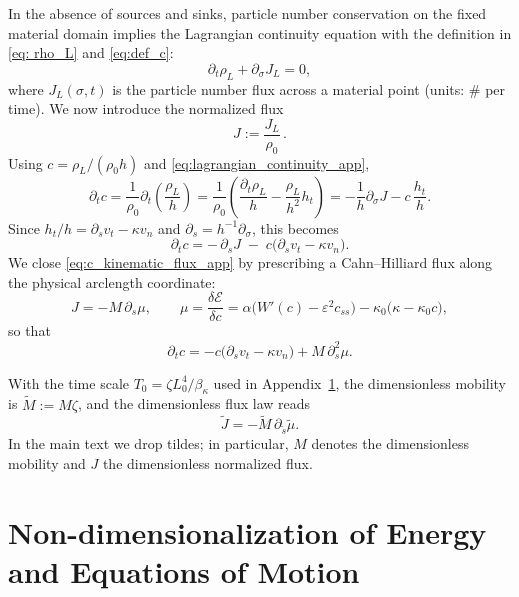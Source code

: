\documentclass[
aip,
jcp,
reprint, 
floatfix
]{revtex4-1}
\begin{document}
In the absence of sources and sinks, particle number conservation on the fixed material domain
implies the Lagrangian continuity equation with the definition in \eqref{eq: rho_L} and \eqref{eq:def_c}:
\begin{equation}
\partial_t \rho_L + \partial_\sigma J_L = 0,
\label{eq:lagrangian_continuity_app}
\end{equation}
where $J_L(\sigma,t)$ is the particle number flux across a material point (units: \# per time).
We now introduce the normalized flux
\begin{equation}
    J:=\frac{J_L}{\rho_0}\,.
\end{equation}
Using $c=\rho_L/(\rho_0 h)$ and \eqref{eq:lagrangian_continuity_app},
\begin{equation}
    \partial_t c=\frac{1}{\rho_0}\partial_t\!\left(\frac{\rho_L}{h}\right)
=\frac{1}{\rho_0}\left(\frac{\partial_t\rho_{L}}{h}-\frac{\rho_L}{h^2}h_t\right)
=-\frac{1}{h}\partial_\sigma J - c\,\frac{h_t}{h}.
\end{equation}
Since $h_t/h=\partial_s v_t-\kappa v_n$ and $\partial_s=h^{-1}\partial_\sigma$, this becomes
\begin{equation}
\partial_t c = -\,\partial_s J \;-\; c\big(\partial_s v_t-\kappa v_n\big).
\label{eq:c_kinematic_flux_app}
\end{equation}
We close \eqref{eq:c_kinematic_flux_app} by prescribing a Cahn--Hilliard flux along the physical
arclength coordinate:
\begin{equation}
J=-M\,\partial_s\mu,
\qquad
\mu=\frac{\delta\mathcal{E}}{\delta c}
=\alpha\big(W'(c)-\varepsilon^2 c_{ss}\big)-\kappa_0\big(\kappa-\kappa_0 c\big),
\label{eq:CH_flux_app}
\end{equation}
so that
\begin{equation}
\partial_t c = -c\big(\partial_s v_t-\kappa v_n\big) + M\,\partial_s^2\mu.
\label{eq:c_evolution_app}
\end{equation}

With the time scale $T_0=\zeta L_0^4/\beta_\kappa$ used in Appendix~\ref{secapp: nondimension}, the
dimensionless mobility is $\tilde M:=M\zeta$, and the dimensionless flux law reads
\begin{equation}
    \tilde J=-\tilde M\,\partial_{\tilde s}\tilde\mu.
\end{equation}
In the main text we drop tildes; in particular, $M$ denotes the dimensionless mobility and $J$
the dimensionless normalized flux.


\section{Non-dimensionalization of Energy and Equations of Motion}\label{secapp: nondimension}
\end{document}
